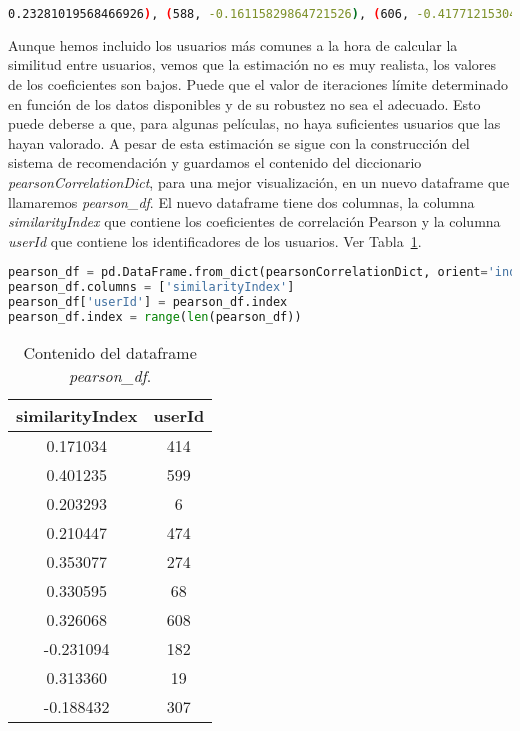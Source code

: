 \documentclass{uimppracticas}
\begin{document}
\begin{lstlisting}[language=bash, basicstyle=\footnotesize, belowskip=-0.5 \baselineskip]
0.23281019568466926), (588, -0.16115829864721526), (606, -0.4177121530460993), (82, 0.3263157894736842), (121, -0.1532100435348196)])
\end{lstlisting}

Aunque hemos incluido los usuarios más comunes a la hora de calcular la similitud entre usuarios, vemos que la estimación no es muy realista, los valores de los coeficientes son bajos. Puede que el valor de iteraciones límite determinado en función de los datos disponibles y de su robustez no sea el adecuado. Esto puede deberse a que, para algunas películas, no haya suficientes usuarios que las hayan valorado. A pesar de esta estimación se sigue con la construcción del sistema de recomendación y guardamos el contenido del diccionario \textit{pearsonCorrelationDict}, para una mejor visualización, en un nuevo dataframe que llamaremos \textit{pearson\_df}. El nuevo dataframe tiene dos columnas, la columna \textit{similarityIndex} que contiene los coeficientes de correlación Pearson y la columna \textit{userId} que contiene los identificadores de los usuarios. Ver Tabla~\ref{pearson_df}.

\begin{lstlisting}[language=python, basicstyle=\footnotesize, belowskip=-0.5 \baselineskip]
pearson_df = pd.DataFrame.from_dict(pearsonCorrelationDict, orient='index')
pearson_df.columns = ['similarityIndex']
pearson_df['userId'] = pearson_df.index
pearson_df.index = range(len(pearson_df))
\end{lstlisting}

\begin{table}[H]
	\centering
	\begin{tabular}{cc}
		\toprule
		similarityIndex &  userId \\
		\midrule
		0.171034 &     414 \\
		0.401235 &     599 \\
		0.203293 &       6 \\
		0.210447 &     474 \\
		0.353077 &     274 \\
		0.330595 &      68 \\
		0.326068 &     608 \\
		-0.231094 &     182 \\
		0.313360 &      19 \\
		-0.188432 &     307 \\
		\bottomrule
	\end{tabular}
	\caption{Contenido del dataframe \textit{pearson\_df}.}
\label{pearson_df}
\end{table}
\end{document}
